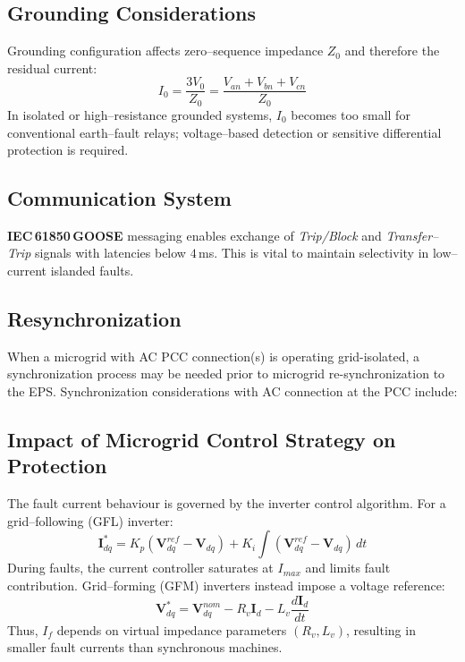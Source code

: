 \subsection{Grounding Considerations}
Grounding configuration affects zero–sequence impedance $Z_0$ and therefore the residual current:
\begin{equation}
I_0 = \frac{3V_0}{Z_0} = \frac{V_{an}+V_{bn}+V_{cn}}{Z_0}
\label{eq:groundcurrent}
\end{equation}
In isolated or high–resistance grounded systems, $I_0$ becomes too small for conventional earth–fault relays; voltage–based detection or sensitive differential protection is required.

\subsection{Communication System}
\textbf{IEC\,61850\,GOOSE} messaging enables exchange of \emph{Trip/Block} and \emph{Transfer–Trip} signals with latencies below $4$\,ms.  
This is vital to maintain selectivity in low–current islanded faults.

\subsection{Resynchronization}
When a microgrid with AC PCC connection(s) is operating grid-isolated, a synchronization process may be needed prior to microgrid re-synchronization to the EPS. Synchronization considerations with AC connection at the PCC include:

\subsection{Impact of Microgrid Control Strategy on Protection}

The fault current behaviour is governed by the inverter control algorithm.
For a grid–following (GFL) inverter:
\begin{equation}
\mathbf{I}_{dq}^* = K_p(\mathbf{V}_{dq}^{ref} - \mathbf{V}_{dq}) + K_i \int (\mathbf{V}_{dq}^{ref} - \mathbf{V}_{dq})\,dt
\label{eq:gflcurrent}
\end{equation}
During faults, the current controller saturates at $I_{max}$ and limits fault contribution.  
Grid–forming (GFM) inverters instead impose a voltage reference:
\begin{equation}
\mathbf{V}_{dq}^* = \mathbf{V}_{dq}^{nom} - R_v \mathbf{I}_d - L_v \frac{d\mathbf{I}_d}{dt}
\label{eq:gfmvoltage}
\end{equation}
Thus, $I_f$ depends on virtual impedance parameters $(R_v,L_v)$, resulting in smaller fault currents than synchronous machines.




